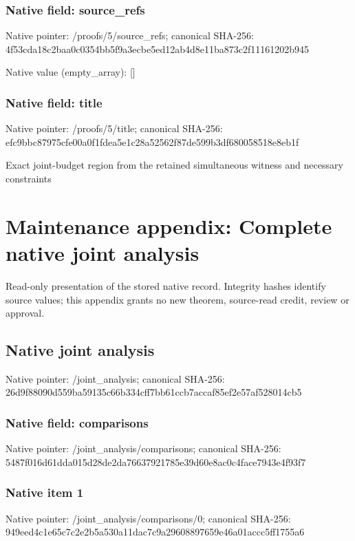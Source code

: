 \documentclass[10pt,a4paper]{article}
\begin{document}
\subsubsection{Native field: source\_\allowbreak{}refs}
Native pointer: /proofs/5/source\_\allowbreak{}refs; canonical SHA-256: 4f53cda18c2baa0c0354bb5f9a3ecbe5ed12ab4d8e11ba873c2f11161202b945

Native value (empty\_\allowbreak{}array): []

\subsubsection{Native field: title}
Native pointer: /proofs/5/title; canonical SHA-256: efc9bbc87975cfe00a0f1fdea5e1c28a52562f87de599b3df680058518e8eb1f

\begingroup\raggedright\sloppy Exact joint-budget region from the retained simultaneous witness and necessary constraints\par\endgroup

\section{Maintenance appendix: Complete native joint analysis}
Read-only presentation of the stored native record. Integrity hashes identify source values; this appendix grants no new theorem, source-read credit, review or approval.

\subsection{Native joint analysis}
Native pointer: /joint\_\allowbreak{}analysis; canonical SHA-256: 26d9f88090d559ba59135c66b334cff7bb61ccb7accaf85ef2e57af528014cb5

\subsubsection{Native field: comparisons}
Native pointer: /joint\_\allowbreak{}analysis/comparisons; canonical SHA-256: 5487f016d61dda015d28de2da76637921785e39d60e8ac0c4face7943e4f93f7

\subsubsection{Native item 1}
Native pointer: /joint\_\allowbreak{}analysis/comparisons/0; canonical SHA-256: 949eed4c1e65c7c2e2b5a530a11dac7c9a29608897659e46a01accc5ff1755a6
\end{document}
